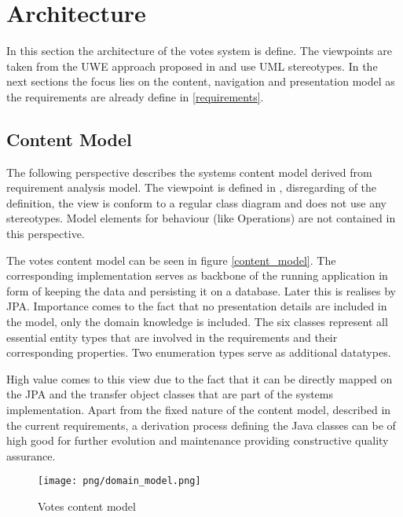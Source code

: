 \section{Architecture}

In this section the architecture of the votes system is define. The viewpoints are taken from the UWE approach proposed in \cite{Uwe08,uweref} and use UML stereotypes. In the next sections the focus lies on the content, navigation and presentation model as the requirements are already define in \ref{requirements}.



\subsection{Content Model}
The following perspective describes the systems content model derived from requirement analysis model. The viewpoint is defined in \cite{Uwe08,uweref}, disregarding of the definition, the view is conform to a regular class diagram and does not use any stereotypes. Model elements for behaviour (like Operations) are not contained in this perspective.

The votes content model can be seen in figure \ref{content_model}. The corresponding implementation serves as backbone of the running application in form of keeping the data and persisting it on a database. Later this is realises by JPA. Importance comes to the fact that no presentation details are included in the model, only the domain knowledge is included. The six classes represent all essential entity types that are involved in the requirements and their corresponding properties. Two enumeration types serve as additional datatypes. 

High value comes to this view due to the fact that it can be directly mapped on the JPA and the transfer object classes that are part of the systems implementation. Apart from the fixed nature of the content model, described in the current requirements, a derivation process defining the Java classes can be of high good for further evolution and maintenance providing constructive quality assurance.

\begin{figure}
\centering
\texttt{[image: png/domain\_model.png]}
\caption{Votes content model}
\label{F:content_model}
\end{figure}


